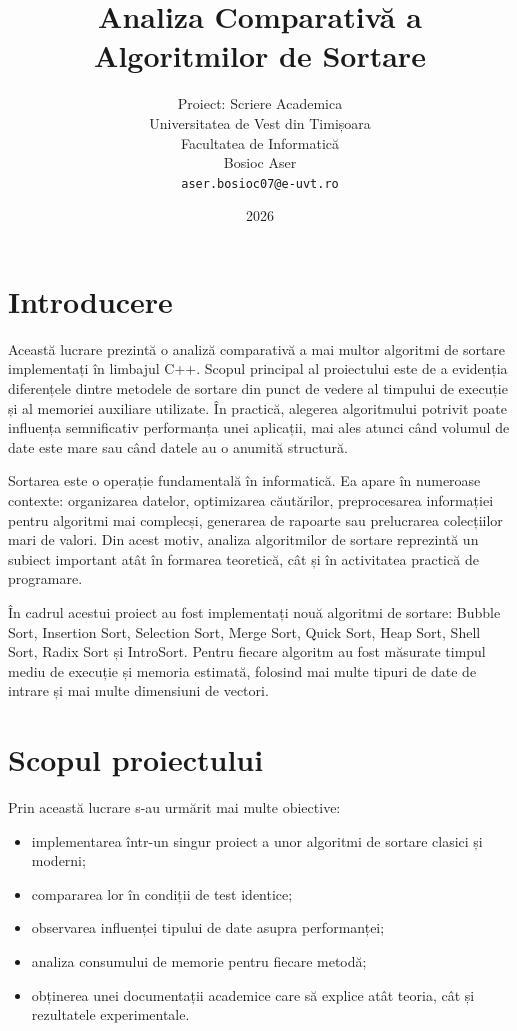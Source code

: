 \documentclass[12pt,a4paper]{article}
\title{\textbf{Analiza Comparativă a Algoritmilor de Sortare}}
\author{
    Proiect: Scriere Academica \\
    Universitatea de Vest din Timișoara \\
    Facultatea de Informatică \\
    Bosioc Aser \\
    \texttt{aser.bosioc07@e-uvt.ro}
}
\date{2026}
\begin{document}
\maketitle
\thispagestyle{empty}
\newpage

\section{Introducere}

Această lucrare prezintă o analiză comparativă a mai multor algoritmi de sortare implementați în limbajul C++. Scopul principal al proiectului este de a evidenția diferențele dintre metodele de sortare din punct de vedere al timpului de execuție și al memoriei auxiliare utilizate. În practică, alegerea algoritmului potrivit poate influența semnificativ performanța unei aplicații, mai ales atunci când volumul de date este mare sau când datele au o anumită structură.

Sortarea este o operație fundamentală în informatică. Ea apare în numeroase contexte: organizarea datelor, optimizarea căutărilor, preprocesarea informației pentru algoritmi mai complecși, generarea de rapoarte sau prelucrarea colecțiilor mari de valori. Din acest motiv, analiza algoritmilor de sortare reprezintă un subiect important atât în formarea teoretică, cât și în activitatea practică de programare.

În cadrul acestui proiect au fost implementați nouă algoritmi de sortare: Bubble Sort, Insertion Sort, Selection Sort, Merge Sort, Quick Sort, Heap Sort, Shell Sort, Radix Sort și IntroSort. Pentru fiecare algoritm au fost măsurate timpul mediu de execuție și memoria estimată, folosind mai multe tipuri de date de intrare și mai multe dimensiuni de vectori.

\section{Scopul proiectului}

Prin această lucrare s-au urmărit mai multe obiective:

\begin{itemize}
    \item implementarea într-un singur proiect a unor algoritmi de sortare clasici și moderni;
    \item compararea lor în condiții de test identice;
    \item observarea influenței tipului de date asupra performanței;
    \item analiza consumului de memorie pentru fiecare metodă;
    \item obținerea unei documentații academice care să explice atât teoria, cât și rezultatele experimentale.
\end{itemize}
\end{document}
